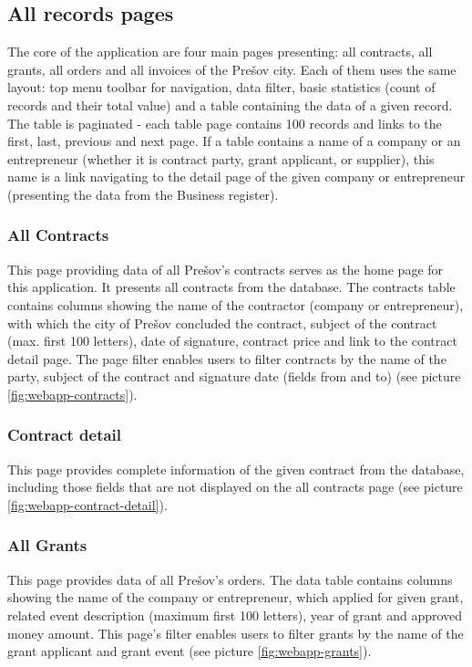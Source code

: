 \documentclass[thesis=B,english]{sprlajur-slovakopendata}[2018/05/12]
\begin{document}
\subsection{All records pages}
The core of the application are four main pages presenting: all contracts, all grants, all orders and all invoices of the Prešov city. Each of them uses the same layout: top menu toolbar for navigation, data filter, basic statistics (count of records and their total value) and a table containing the data of a given record. The table is paginated - each table page contains 100 records and links to the first, last, previous and next page. If a table contains a name of a company or an entrepreneur (whether it is contract party, grant applicant, or supplier), this name is a link navigating to the detail page of the given company or entrepreneur (presenting the data from the Business register).
\subsubsection{All Contracts}
This page providing data of all Prešov's contracts serves as the home page for this application. It presents all contracts from the database. The contracts table contains columns showing the name of the contractor (company or entrepreneur), with which the city of Prešov concluded the contract, subject of the contract (max. first 100 letters), date of signature, contract price and link to the contract detail page. The page filter enables users to filter contracts by the name of the party, subject of the contract and signature date (fields from and to) (see picture \ref{fig:webapp-contracts}).


\subsubsection{Contract detail}
This page provides complete information of the given contract from the database, including those fields that are not displayed on the all contracts page (see picture \ref{fig:webapp-contract-detail}).


\subsubsection{All Grants}
This page provides data of all Prešov's orders. The data table contains columns showing the name of the company or entrepreneur, which applied for given grant, related event description (maximum first 100 letters), year of grant and approved money amount. This page's filter enables users to filter grants by the name of the grant applicant and grant event (see picture \ref{fig:webapp-grants}).
\end{document}

